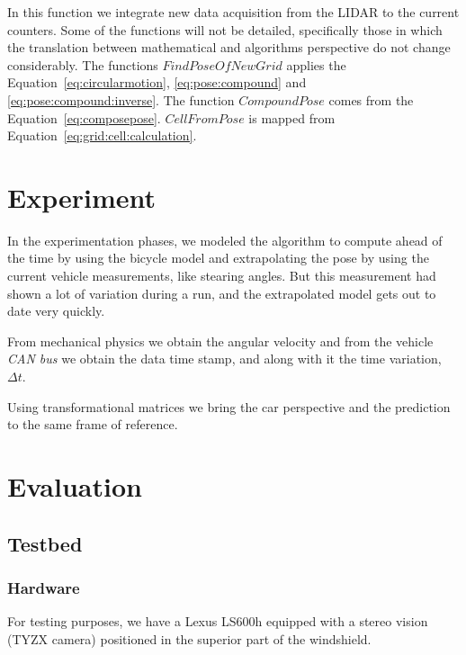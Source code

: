 In this function we integrate new data acquisition from the LIDAR to the current counters. Some of the functions will not be detailed, specifically those in which the translation between mathematical and algorithms perspective do not change considerably.
The functions $FindPoseOfNewGrid$ applies the Equation~\ref{eq:circularmotion}, \ref{eq:pose:compound}  and \ref{eq:pose:compound:inverse}. The function $CompoundPose$ comes from the Equation~\ref{eq:composepose}. $CellFromPose$ is mapped from Equation~\ref{eq:grid:cell:calculation}.

\section{Experiment}

In the experimentation phases, we modeled the algorithm to compute ahead of the time by using the bicycle model and extrapolating the pose by using the current vehicle measurements, like stearing angles. But this measurement had shown a lot of variation during a run, and the extrapolated model gets out to date very quickly.

From mechanical physics we obtain the angular velocity and from the vehicle \emph{CAN bus} we obtain the data time stamp, and along with it the time variation, $\Delta t$.

Using transformational matrices we bring the car perspective \cite{iyengar1991autonomous} and the prediction to the same frame of reference.

\section{Evaluation}


\subsection{Testbed}
\label{sec:testbed}

\subsubsection*{Hardware}

For testing purposes, we have a Lexus LS600h equipped with a stereo vision (TYZX camera) positioned in the superior part of the windshield.

